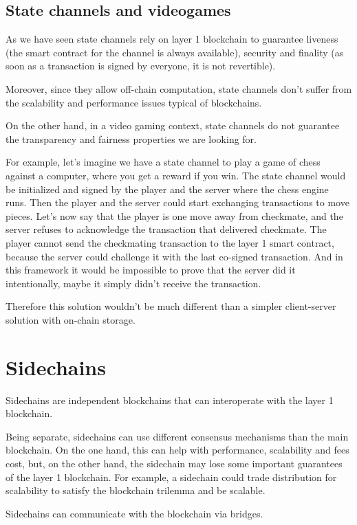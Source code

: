 \documentclass[11pt]{article}
\begin{document}
\subsection{State channels and videogames} \label{subsection:scav}
As we have seen state channels rely on layer 1 blockchain to guarantee liveness (the smart contract for the channel is always available), security and finality (as soon as a transaction is signed by everyone, it is not revertible).

Moreover, since they allow off-chain computation, state channels don't suffer from the scalability and performance issues typical of blockchains.

On the other hand, in a video gaming context, state channels do not guarantee the transparency and fairness properties we are looking for.

For example, let's imagine we have a state channel to play a game of chess against a computer, where you get a reward if you win. The state channel would be initialized and signed by the player and the server where the chess engine runs.
Then the player and the server could start exchanging transactions to move pieces. Let's now say that the player is one move away from checkmate, and the server refuses to acknowledge the transaction that delivered checkmate.
The player cannot send the checkmating transaction to the layer 1 smart contract, because the server could challenge it with the last co-signed transaction. And in this framework it would be impossible to prove that the server did it intentionally, maybe it simply didn't receive the transaction.

Therefore this solution wouldn't be much different than a simpler client-server solution with on-chain storage.

\section{Sidechains} \label{section:sidechains}
Sidechains are independent blockchains that can interoperate with the layer 1 blockchain.

Being separate, sidechains can use different consensus mechanisms than the main blockchain. On the one hand, this can help with performance, scalability and fees cost, but, on the other hand, the sidechain may lose some important guarantees of the layer 1 blockchain.
For example, a sidechain could trade distribution for scalability to satisfy the blockchain trilemma and be scalable.

Sidechains can communicate with the blockchain via bridges.
\end{document}
